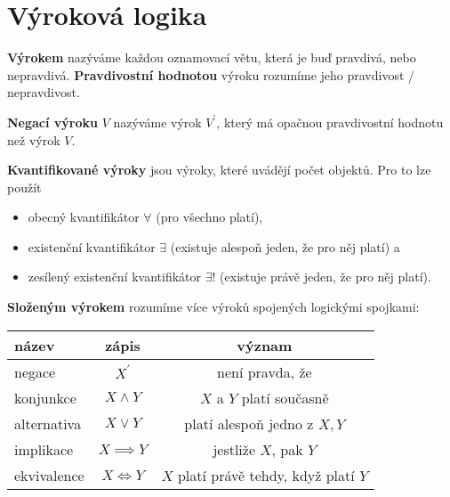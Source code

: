 \section{Výroková logika}
\begin{definition}
  \textbf{Výrokem} nazýváme každou oznamovací větu, která je buď pravdivá, nebo nepravdivá. \textbf{Pravdivostní hodnotou} výroku rozumíme jeho pravdivost / nepravdivost.
\end{definition}

\begin{definition}
  \textbf{Negací výroku} $V$ nazýváme výrok $V^\prime$, který má opačnou pravdivostní hodnotu než výrok $V$.
\end{definition}

\begin{pozn}
  \textbf{Kvantifikované výroky} jsou výroky, které uvádějí počet objektů. Pro to lze použít
  \begin{itemize}
    \item obecný kvantifikátor $\forall$ (pro všechno platí),
    \item existenční kvantifikátor $\exists$ (existuje alespoň jeden, že pro něj platí) a
    \item zesílený existenční kvantifikátor $\exists !$ (existuje právě jeden, že pro něj platí).
  \end{itemize}
\end{pozn}

\begin{definition}
  \textbf{Složeným výrokem} rozumíme více výroků spojených logickými spojkami:
  \begin{center}
    \begin{tabular}{l | c c}
      název & zápis & význam \\
      \hline
      negace & $X^\prime$ & není pravda, že \\
      konjunkce & $X\land Y$ & $X$ a $Y$ platí současně \\
      alternativa & $X\lor Y$ & platí alespoň jedno z $X,Y$\\
      implikace & $X\implies Y$ & jestliže $X$, pak $Y$\\
      ekvivalence & $X\iff Y$ & $X$ platí právě tehdy, když platí $Y$
    \end{tabular}
  \end{center}
\end{definition}


